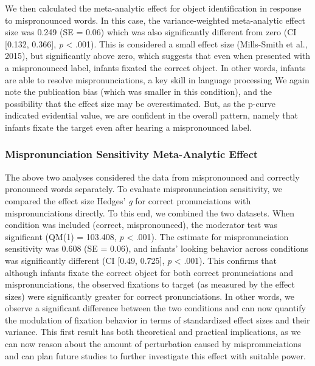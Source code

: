 \documentclass[man]{apa6}
\begin{document}
We then calculated the meta-analytic effect for object identification in response to mispronounced words. In this case, the variance-weighted meta-analytic effect size was 0.249 (SE = 0.06) which was also significantly different from zero (CI {[}0.132, 0.366{]}, \emph{p} \textless{} .001). This is considered a small effect size (Mills-Smith et al., 2015), but significantly above zero, which suggests that even when presented with a mispronounced label, infants fixated the correct object. In other words, infants are able to resolve mispronunciations, a key skill in language processing We again note the publication bias (which was smaller in this condition), and the possibility that the effect size may be overestimated. But, as the p-curve indicated evidential value, we are confident in the overall pattern, namely that infants fixate the target even after hearing a mispronounced label.

\hypertarget{mispronunciation-sensitivity-meta-analytic-effect}{%
\subsubsection{Mispronunciation Sensitivity Meta-Analytic Effect}\label{mispronunciation-sensitivity-meta-analytic-effect}}

The above two analyses considered the data from mispronounced and correctly pronounced words separately. To evaluate mispronunciation sensitivity, we compared the effect size Hedges' \emph{g} for correct pronunciations with mispronunciations directly. To this end, we combined the two datasets. When condition was included (correct, mispronounced), the moderator test was significant (QM(1) = 103.408, \emph{p} \textless{} .001). The estimate for mispronunciation sensitivity was 0.608 (SE = 0.06), and infants' looking behavior across conditions was significantly different (CI {[}0.49, 0.725{]}, \emph{p} \textless{} .001). This confirms that although infants fixate the correct object for both correct pronunciations and mispronunciations, the observed fixations to target (as measured by the effect sizes) were significantly greater for correct pronunciations. In other words, we observe a significant difference between the two conditions and can now quantify the modulation of fixation behavior in terms of standardized effect sizes and their variance. This first result has both theoretical and practical implications, as we can now reason about the amount of perturbation caused by mispronunciations and can plan future studies to further investigate this effect with suitable power.
\end{document}
